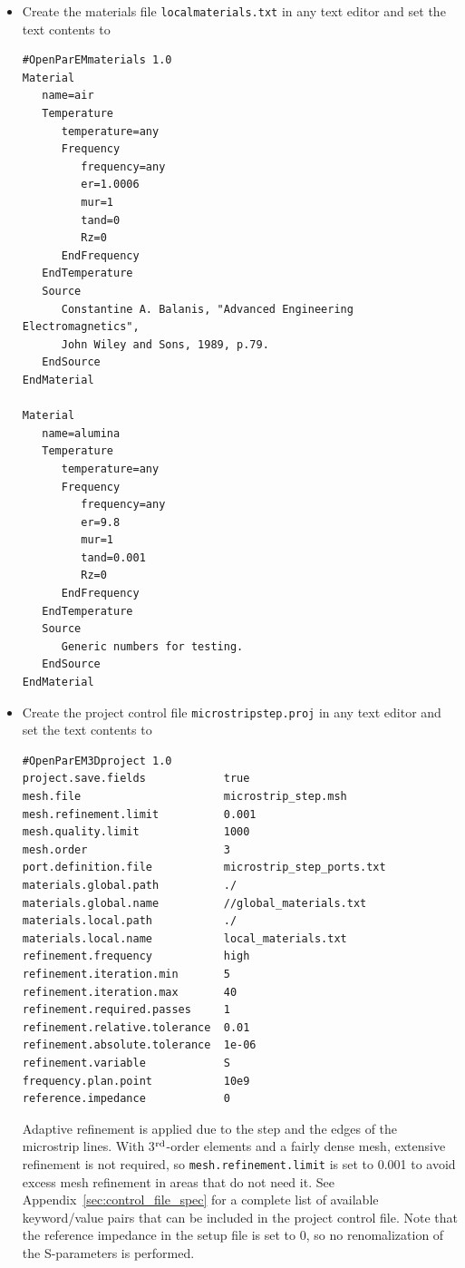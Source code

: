 \documentclass[titlepage]{article}
\renewcommand\_{\textunderscore\linebreak[1]}
\begin{document}
\begin{itemize}

\item Create the materials file \texttt{local\_materials.txt} in any text editor and set the text contents to
\begin{Verbatim}[fontsize=\small]
#OpenParEMmaterials 1.0
Material
   name=air
   Temperature
      temperature=any
      Frequency
         frequency=any
         er=1.0006
         mur=1
         tand=0
         Rz=0
      EndFrequency
   EndTemperature
   Source
      Constantine A. Balanis, "Advanced Engineering Electromagnetics",
      John Wiley and Sons, 1989, p.79.
   EndSource
EndMaterial

Material
   name=alumina
   Temperature
      temperature=any
      Frequency
         frequency=any
         er=9.8
         mur=1
         tand=0.001
         Rz=0
      EndFrequency
   EndTemperature
   Source
      Generic numbers for testing.
   EndSource
EndMaterial
\end{Verbatim}

\item Create the project control file \texttt{microstrip\_step.proj} in any text editor and set the text contents to
\begin{Verbatim}[fontsize=\small]
#OpenParEM3Dproject 1.0
project.save.fields            true
mesh.file                      microstrip_step.msh
mesh.refinement.limit          0.001
mesh.quality.limit             1000
mesh.order                     3
port.definition.file           microstrip_step_ports.txt
materials.global.path          ./
materials.global.name          //global_materials.txt
materials.local.path           ./
materials.local.name           local_materials.txt
refinement.frequency           high
refinement.iteration.min       5
refinement.iteration.max       40
refinement.required.passes     1
refinement.relative.tolerance  0.01
refinement.absolute.tolerance  1e-06
refinement.variable            S
frequency.plan.point           10e9
reference.impedance            0
\end{Verbatim}

\noindent Adaptive refinement is applied due to the step and the edges of the microstrip lines.  With 3$^{\textnormal{rd}}$-order elements and a fairly dense mesh, extensive refinement is not required, so \texttt{mesh.refinement.limit} is set to 0.001 to avoid excess mesh refinement in areas that do not need it.
See Appendix~\ref{sec:control_file_spec} for a complete list of available keyword/value pairs that can be included in the project control file. Note that the reference impedance in the setup file is set to 0, so no renomalization of the S-parameters is performed.


\end{itemize}
\end{document}
